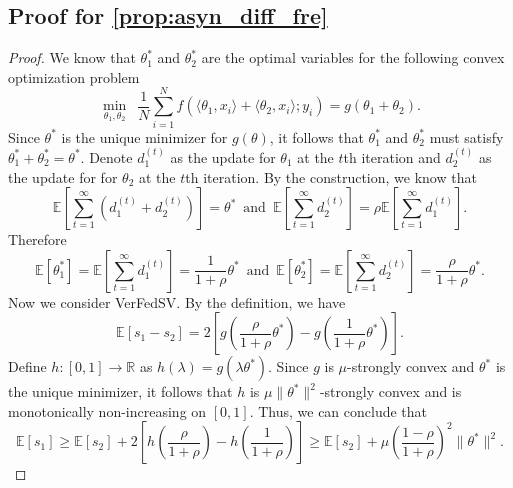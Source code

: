 \subsection{Proof for \autoref{prop:asyn_diff_fre}}
\begin{proof}
    We know that $\theta_1^*$ and $\theta_2^*$ are the optimal variables for the following convex optimization problem 
    \[\min_{\theta_1, \theta_2}\enspace \frac{1}{N}\sum_{i=1}^N f(\langle\theta_1, x_i\rangle + \langle\theta_2, x_i\rangle; y_i) = g(\theta_1 + \theta_2).\]
    Since $\theta^*$ is the unique minimizer for $g(\theta)$, it follows that $\theta_1^*$ and $\theta_2^*$ must satisfy $\theta_1^* + \theta_2^* = \theta^*$. Denote $d_1^{(t)}$ as the update for $\theta_1$ at the $t$th iteration and $d_2^{(t)}$ as the update for for $\theta_2$ at the $t$th iteration. By the construction, we know that 
    \[\mathbb{E} \left[ \sum_{t=1}^\infty ( d_1^{(t)} + d_2^{(t)} ) \right] = \theta^* \enspace\text{and}\enspace \mathbb{E}\left[ \sum_{t=1}^\infty d_2^{(t)} \right] = \rho \mathbb{E}\left[ \sum_{t=1}^\infty d_1^{(t)} \right].\]
    Therefore
    \[
        \mathbb{E}[\theta_1^*] = \mathbb{E}\left[ \sum_{t=1}^\infty d_1^{(t)} \right] = \frac{1}{1+\rho} \theta^* \enspace\text{and}\enspace \mathbb{E}[\theta_2^*] = \mathbb{E}\left[ \sum_{t=1}^\infty d_2^{(t)} \right] = \frac{\rho}{1+\rho} \theta^*.
    \]
    Now we consider VerFedSV. By the definition, we have 
    \[\mathbb{E}[s_1 - s_2] = 2\left[g\left(\frac{\rho}{1+\rho}\theta^*\right) - g\left(\frac{1}{1+\rho}\theta^*\right)\right].\]
    Define $h:[0,1]\to\mathbb{R}$ as $h(\lambda) = g(\lambda \theta^*)$. Since $g$ is $\mu$-strongly convex and $\theta^*$ is the unique minimizer, it follows that $h$ is $\mu\|\theta^*\|^2$-strongly convex and is monotonically non-increasing on $[0,1]$. Thus, we can conclude that 
    \[\mathbb{E}[s_1] \geq \mathbb{E}[s_2] + 2\left[h\left(\frac{\rho}{1+\rho}\right) - h\left(\frac{1}{1+\rho}\right)\right] \geq \mathbb{E}[s_2] + \mu\left(\frac{1-\rho}{1+\rho}\right)^2\|\theta^*\|^2.\]
\end{proof}